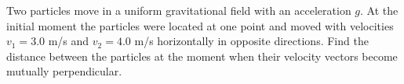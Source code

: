 
\item Two particles move in a uniform gravitational field with an acceleration \( g \). At the initial moment the particles were located at one point and moved with velocities \( v_1 = 3.0 \) m/s and \( v_2 = 4.0 \) m/s horizontally in opposite directions. Find the distance between the particles at the moment when their velocity vectors become mutually perpendicular.
